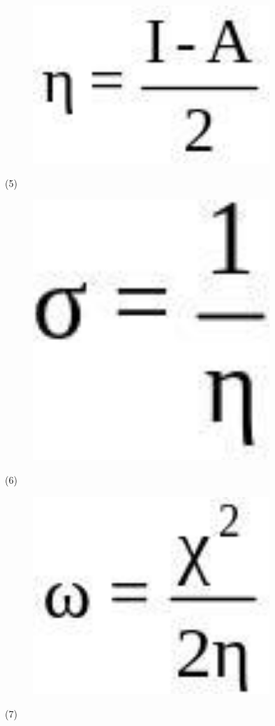 \begin{figure}[H]
	\centering
	\includegraphics[width=0.8\textwidth]{assets/33}
	\caption*{}
\end{figure} (5)

\begin{figure}[H]
	\centering
	\includegraphics[width=0.8\textwidth]{assets/34}
	\caption*{}
\end{figure} (6)

\begin{figure}[H]
	\centering
	\includegraphics[width=0.8\textwidth]{assets/35}
	\caption*{}
\end{figure} (7)

